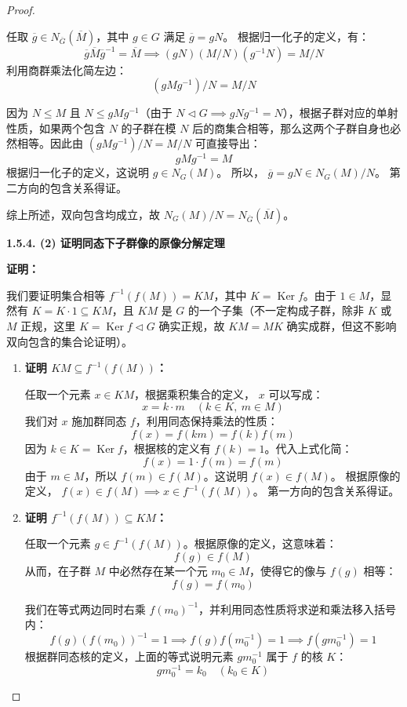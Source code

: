 \documentclass[]{article}
\begin{document}
\begin{proof}
\begin{enumerate}
	任取 $\overline{g} \in N_{\overline{G}}(\overline{M})$，其中 $g \in G$ 满足 $\overline{g} = gN$。
	根据归一化子的定义，有：
	\[ \overline{g} \overline{M} \overline{g}^{-1} = \overline{M} \implies (gN)(M/N)(g^{-1}N) = M/N \]
	利用商群乘法化简左边：
	\[ (gMg^{-1})/N = M/N \]
	
	因为 $N \leqslant M$ 且 $N \leqslant gMg^{-1}$（由于 $N \triangleleft G \implies gNg^{-1} = N$），根据子群对应的单射性质，如果两个包含 $N$ 的子群在模 $N$ 后的商集合相等，那么这两个子群自身也必然相等。因此由 $(gMg^{-1})/N = M/N$ 可直接导出：
	\[ gMg^{-1} = M \]
	根据归一化子的定义，这说明 $g \in N_G(M)$。
	所以， $\overline{g} = gN \in N_G(M)/N$。
	第二方向的包含关系得证。
\end{enumerate}

综上所述，双向包含均成立，故 $N_G(M)/N = N_{\overline{G}}(\overline{M})$。

\bigskip
\noindent \textbf{1.5.4. (2) 证明同态下子群像的原像分解定理}

\medskip
\noindent \textbf{证明：}

我们要证明集合相等 $f^{-1}(f(M)) = KM$，其中 $K = \operatorname{Ker} f$。由于 $1 \in M$，显然有 $K = K \cdot 1 \subseteq KM$，且 $KM$ 是 $G$ 的一个子集（不一定构成子群，除非 $K$ 或 $M$ 正规，这里 $K = \operatorname{Ker} f \triangleleft G$ 确实正规，故 $KM = MK$ 确实成群，但这不影响双向包含的集合论证明）。

\begin{enumerate}
	\item \textbf{证明 $KM \subseteq f^{-1}(f(M))$：}
	
	任取一个元素 $x \in KM$，根据乘积集合的定义， $x$ 可以写成：
	\[ x = k \cdot m \quad (k \in K, \ m \in M) \]
	我们对 $x$ 施加群同态 $f$，利用同态保持乘法的性质：
	\[ f(x) = f(km) = f(k)f(m) \]
	因为 $k \in K = \operatorname{Ker} f$，根据核的定义有 $f(k) = 1$。代入上式化简：
	\[ f(x) = 1 \cdot f(m) = f(m) \]
	由于 $m \in M$，所以 $f(m) \in f(M)$。这说明 $f(x) \in f(M)$。
	根据原像的定义， $f(x) \in f(M) \implies x \in f^{-1}(f(M))$。
	第一方向的包含关系得证。
	
	\item \textbf{证明 $f^{-1}(f(M)) \subseteq KM$：}
	
	任取一个元素 $g \in f^{-1}(f(M))$。根据原像的定义，这意味着：
	\[ f(g) \in f(M) \]
	从而，在子群 $M$ 中必然存在某一个元 $m_0 \in M$，使得它的像与 $f(g)$ 相等：
	\[ f(g) = f(m_0) \]
	
	我们在等式两边同时右乘 $f(m_0)^{-1}$，并利用同态性质将求逆和乘法移入括号内：
	\[ f(g) (f(m_0))^{-1} = 1 \implies f(g) f(m_0^{-1}) = 1 \implies f(g m_0^{-1}) = 1 \]
	根据群同态核的定义，上面的等式说明元素 $g m_0^{-1}$ 属于 $f$ 的核 $K$：
	\[ g m_0^{-1} = k_0 \quad (k_0 \in K) \]
	

\end{enumerate}
\end{proof}
\end{document}
